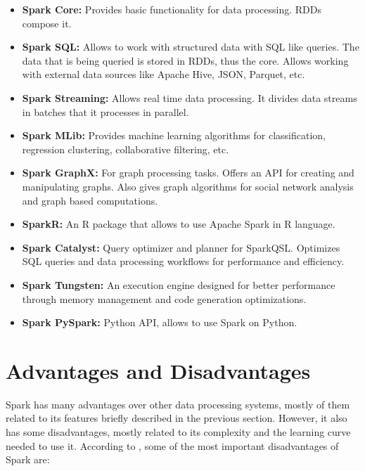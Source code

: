 \begin{itemize}
    \item \textbf{Spark Core:} Provides basic functionality for data processing.
    RDDs compose it.
    \item \textbf{Spark SQL:} Allows to work with structured data with SQL like
    queries. The data that is being queried is stored in RDDs, thus the core.
    Allows working with external data sources like Apache Hive, JSON, Parquet,
    etc.
    \item \textbf{Spark Streaming:} Allows real time data processing. It divides
    data streams in batches that it processes in parallel.
    \item \textbf{Spark MLib:} Provides machine learning algorithms for
    classification, regression clustering, collaborative filtering, etc.
    \item \textbf{Spark GraphX:} For graph processing tasks. Offers an API for
    creating and manipulating graphs. Also gives graph algorithms for social
    network analysis and graph based computations.
    \item \textbf{SparkR:} An R package that allows to use Apache Spark in R
    language.
    \item \textbf{Spark Catalyst:} Query optimizer and planner for SparkQSL.
    Optimizes SQL queries and data processing workflows for performance and
    efficiency.
    \item \textbf{Spark Tungsten:} An execution engine designed for better
    performance through memory management and code generation optimizations.
    \item \textbf{Spark PySpark:} Python API, allows to use Spark on Python.
\end{itemize}

\section{Advantages and Disadvantages}

Spark has many advantages over other data processing systems, mostly of them 
related to its features briefly described in the previous section. However, it
also has some disadvantages, mostly related to its complexity and the learning
curve needed to use it. According to \cite{openai_chatgpt}, some of the
most important disadvantages of Spark are:

